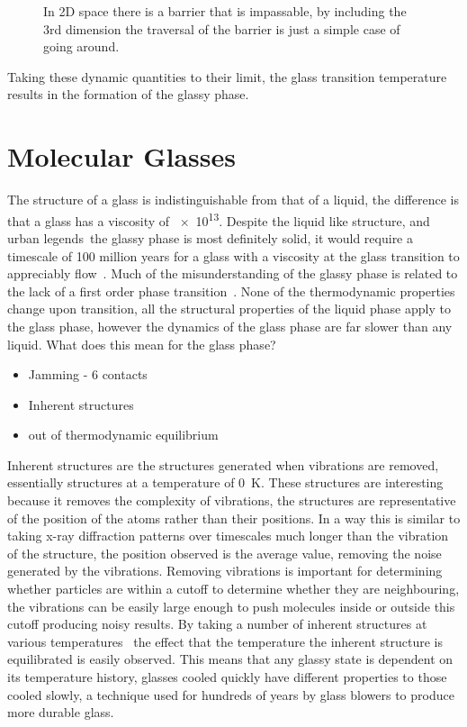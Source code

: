 \begin{figure}
    \caption{In 2D space there is a barrier that is impassable, by including the 3rd dimension the traversal of the barrier is just a simple case of going around.}
    \label{fig:barrier dimensions}
\end{figure}

Taking these dynamic quantities to their limit, the glass transition temperature results in the formation of the glassy phase.


\section{Molecular Glasses}

The structure of a glass is indistinguishable from that of a liquid, the difference is that a glass has a viscosity of \SI{e13}{\poise}. Despite the liquid like structure, and urban legends~\tocite the glassy phase is most definitely solid, it would require a timescale of 100 million years for a glass with a viscosity at the glass transition to appreciably flow~\tocite. Much of the misunderstanding of the glassy phase is related to the lack of a first order phase transition~\tocite. None of the thermodynamic properties change upon transition, all the structural properties of the liquid phase apply to the glass phase, however the dynamics of the glass phase are far slower than any liquid. What does this mean for the glass phase? 

\begin{itemize}
    \item Jamming - 6 contacts
    \item Inherent structures
    \item out of thermodynamic equilibrium
\end{itemize}

Inherent structures are the structures generated when vibrations are removed, essentially structures at a temperature of \SI{0}{\kelvin}. These structures are interesting because it removes the complexity of vibrations, the structures are representative of the position of the atoms rather than their positions. In a way this is similar to taking x-ray diffraction patterns over timescales much longer than the vibration of the structure, the position observed is the average value, removing the noise generated by the vibrations. Removing vibrations is important for determining whether particles are within a cutoff to determine whether they are neighbouring, the vibrations can be easily large enough to push molecules inside or outside this cutoff producing noisy results. By taking a number of inherent structures at various temperatures~ the effect that the temperature the inherent structure is equilibrated is easily observed. This means that any glassy state is dependent on its temperature history, glasses cooled quickly have different properties to those cooled slowly, a technique used for hundreds of years by glass blowers to produce more durable glass\tocite.

